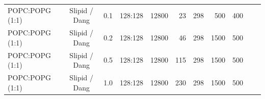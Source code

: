 \documentclass[journal=jpcbfk]{achemso}
\begin{document}
\begin{table}[htb]
\begin{minipage}[t]{\textwidth}
{\begin{tabular}{l c c r r r r r r c c}
      POPC:POPG (1:1)        & Slipid / Dang \cite{jambeck12b,jambeck2012another,smith94,dang06} & 0.1  & 128:128 & 12800 & 23  &  298  & 500 & 400 & \cite{slipidPOPC50POPG50T298K} \\
      POPC:POPG (1:1)        & Slipid / Dang \cite{jambeck12b,jambeck2012another,smith94,dang06} & 0.2  & 128:128 & 12800 & 46  &  298  & 1500 & 500 & \cite{slipidPOPC50POPG50T298K} \\
      POPC:POPG (1:1)        & Slipid / Dang \cite{jambeck12b,jambeck2012another,smith94,dang06} & 0.5  & 128:128 & 12800 & 115 &  298  & 1500 & 500 & \cite{slipidPOPC50POPG50T298K} \\
      POPC:POPG (1:1)        & Slipid / Dang \cite{jambeck12b,jambeck2012another,smith94,dang06} & 1.0  & 128:128 & 12800 & 230 &  298  & 1500 & 500 & \cite{slipidPOPC50POPG50T298K} \\
    \end{tabular}
    }
  \end{minipage}
     \\
\end{table}
\end{document}

